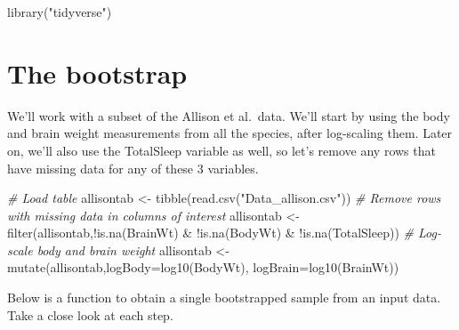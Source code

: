 \documentclass[
]{book}
\newenvironment{Shaded}{\begin{snugshade}}{\end{snugshade}}
\newcommand{\AttributeTok}[1]{\textcolor[rgb]{0.77,0.63,0.00}{#1}}
\newcommand{\CommentTok}[1]{\textcolor[rgb]{0.56,0.35,0.01}{\textit{#1}}}
\newcommand{\FunctionTok}[1]{\textcolor[rgb]{0.00,0.00,0.00}{#1}}
\newcommand{\NormalTok}[1]{#1}
\newcommand{\OtherTok}[1]{\textcolor[rgb]{0.56,0.35,0.01}{#1}}
\newcommand{\SpecialCharTok}[1]{\textcolor[rgb]{0.00,0.00,0.00}{#1}}
\newcommand{\StringTok}[1]{\textcolor[rgb]{0.31,0.60,0.02}{#1}}
\begin{document}
\begin{Shaded}
\begin{Highlighting}[]
\FunctionTok{library}\NormalTok{(}\StringTok{"tidyverse"}\NormalTok{)}
\end{Highlighting}
\end{Shaded}

\hypertarget{the-bootstrap}{%
\section{The bootstrap}\label{the-bootstrap}}

We'll work with a subset of the Allison et al.~data. We'll start by using the body and brain weight measurements from all the species, after log-scaling them. Later on, we'll also use the TotalSleep variable as well, so let's remove any rows that have missing data for any of these 3 variables.

\begin{Shaded}
\begin{Highlighting}[]
\CommentTok{\# Load table}
\NormalTok{allisontab }\OtherTok{\textless{}{-}} \FunctionTok{tibble}\NormalTok{(}\FunctionTok{read.csv}\NormalTok{(}\StringTok{"Data\_allison.csv"}\NormalTok{))}
\CommentTok{\# Remove rows with missing data in columns of interest }
\NormalTok{allisontab }\OtherTok{\textless{}{-}} \FunctionTok{filter}\NormalTok{(allisontab,}\SpecialCharTok{!}\FunctionTok{is.na}\NormalTok{(BrainWt) }\SpecialCharTok{\&} \SpecialCharTok{!}\FunctionTok{is.na}\NormalTok{(BodyWt) }\SpecialCharTok{\&} \SpecialCharTok{!}\FunctionTok{is.na}\NormalTok{(TotalSleep))}
\CommentTok{\# Log{-}scale body and brain weight}
\NormalTok{allisontab }\OtherTok{\textless{}{-}} \FunctionTok{mutate}\NormalTok{(allisontab,}\AttributeTok{logBody=}\FunctionTok{log10}\NormalTok{(BodyWt), }\AttributeTok{logBrain=}\FunctionTok{log10}\NormalTok{(BrainWt))}
\end{Highlighting}
\end{Shaded}

Below is a function to obtain a single bootstrapped sample from an input data. Take a close look at each step.
\end{document}
